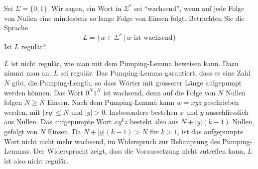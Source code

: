 Sei $\Sigma=\{0,1\}$.
Wir sagen, ein Wort in $\Sigma^*$ sei ``wachsend'',
wenn auf jede Folge von Nullen eine mindestens
so lange Folge von Einsen folgt.
Betrachten Sie die Sprache
\[
L=\{
w\in \Sigma^*\,|\, \text{$w$ ist wachsend}
\}
\]
Ist $L$ regulär?

\begin{loesung}
$L$ ist nicht regulär, wie man mit dem Pumping-Lemma beweisen kann.
Dazu nimmt man an, $L$ sei regulär. Das Pumping-Lemma garantiert, dass
es eine Zahl $N$ gibt, die Pumping-Length, so dass Wörter mit grösserer
Länge aufgepumpt werden können. Das Wort $0^N1^N$ ist wachsend, denn
auf die Folge von $N$ Nullen folgen $N\ge N$ Einsen. Nach dem Pumping-Lemma
kann $w=xyz$ geschrieben werden, mit $|xy|\le N$ und $|y|>0$. Insbesondere bestehen
$x$ und $y$ ausschliesslich aus Nullen. Das aufgepumpte Wort
$xy^kz$ besteht also aus $N+|y|(k-1)$ Nullen, gefolgt von $N$ Einsen.
Da $N+|y|(k-1) > N$ für $k>1$, ist das aufgepumpte Wort nicht nicht
mehr wachsend, im Widerspruch zur Behauptung des Pumping-Lemmas. Der
Widersprucht zeigt, dass die Voraussetzung nicht zutreffen kann, $L$
ist also nicht regulär.
\end{loesung}
